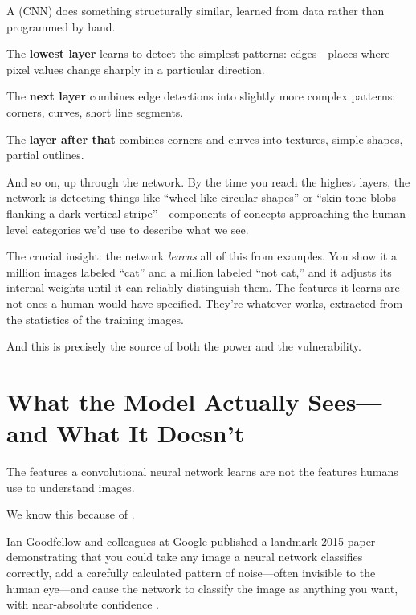 A  (CNN) does something structurally similar, learned from data rather than programmed by hand.

The \textbf{lowest layer} learns to detect the simplest patterns: edges---places where pixel values change sharply in a particular direction.

The \textbf{next layer} combines edge detections into slightly more complex patterns: corners, curves, short line segments.

The \textbf{layer after that} combines corners and curves into textures, simple shapes, partial outlines.

And so on, up through the network. By the time you reach the highest layers, the network is detecting things like ``wheel-like circular shapes'' or ``skin-tone blobs flanking a dark vertical stripe''---components of concepts approaching the human-level categories we'd use to describe what we see.

The crucial insight: the network \emph{learns} all of this from examples. You show it a million images labeled ``cat'' and a million labeled ``not cat,'' and it adjusts its internal weights until it can reliably distinguish them. The features it learns are not ones a human would have specified. They're whatever works, extracted from the statistics of the training images.

And this is precisely the source of both the power and the vulnerability.

\section{What the Model Actually Sees---and What It Doesn't}
\label{sec:adversarial}

The features a convolutional neural network learns are not the features humans use to understand images.

We know this because of .

Ian Goodfellow and colleagues at Google published a landmark 2015 paper demonstrating that you could take any image a neural network classifies correctly, add a carefully calculated pattern of noise---often invisible to the human eye---and cause the network to classify the image as anything you want, with near-absolute confidence \autocite{goodfellow2015explaining}.

